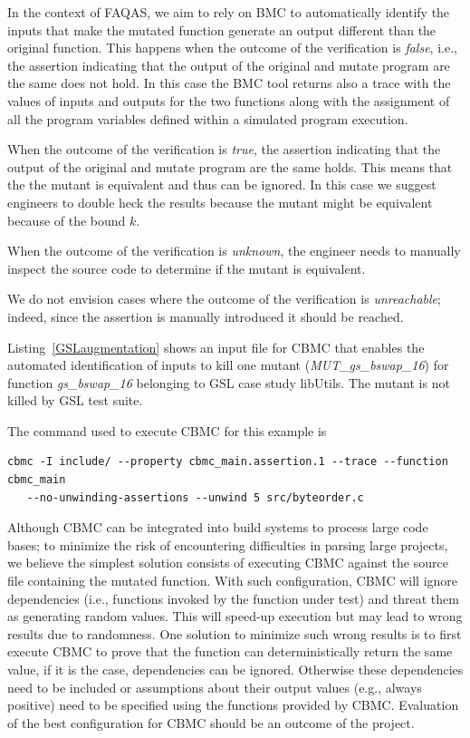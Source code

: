 In the context of FAQAS, we aim to rely on BMC to automatically identify the inputs that make the mutated function generate an output different than the original function. This happens when the outcome of the verification is \emph{false}, i.e., the assertion indicating that the output of the original and mutate program are the same does not hold. In this case the BMC tool returns also a trace with the values of inputs and outputs for the two functions along with the assignment of all the program variables defined within a simulated program execution.

When the outcome of the verification is \emph{true}, the assertion indicating that the output of the original and mutate program are the same holds. This means that the the mutant is equivalent and thus can be ignored. In this case we suggest engineers to double heck the results because the mutant might be equivalent because of  the bound $k$.

When the outcome of the verification is \emph{unknown}, the engineer needs to manually inspect the source code to determine if the mutant is equivalent.

We do not envision cases where the outcome of the verification is \emph{unreachable}; indeed, since the assertion is manually introduced it should be reached.





Listing~\ref{GSLaugmentation} shows an input file for CBMC that enables the automated identification of inputs to kill one mutant (\emph{MUT\_gs\_bswap\_16}) for function \emph{gs\_bswap\_16} belonging to GSL case study libUtils. The mutant 
is not killed by GSL test suite.

The command used to execute CBMC for this example is
\begin{verbatim}
cbmc -I include/ --property cbmc_main.assertion.1 --trace --function cbmc_main 
   --no-unwinding-assertions --unwind 5 src/byteorder.c
\end{verbatim}

Although CBMC can be integrated into build systems to process large code bases; to minimize the risk of encountering difficulties in parsing large projects, we believe the simplest solution consists of executing CBMC against the source file containing the mutated function. With such configuration, CBMC will ignore dependencies (i.e., functions invoked by the function under test) and threat them as generating random values. This will speed-up execution but may lead to wrong results due to randomness. One solution to minimize such wrong results is to first execute CBMC to prove that the function can deterministically return the same value, if it is the case, dependencies can be ignored. Otherwise these dependencies need to be included or assumptions about their output values (e.g., always positive) need to be specified using the functions provided by CBMC. Evaluation of the best configuration for CBMC should be an outcome of the project.

